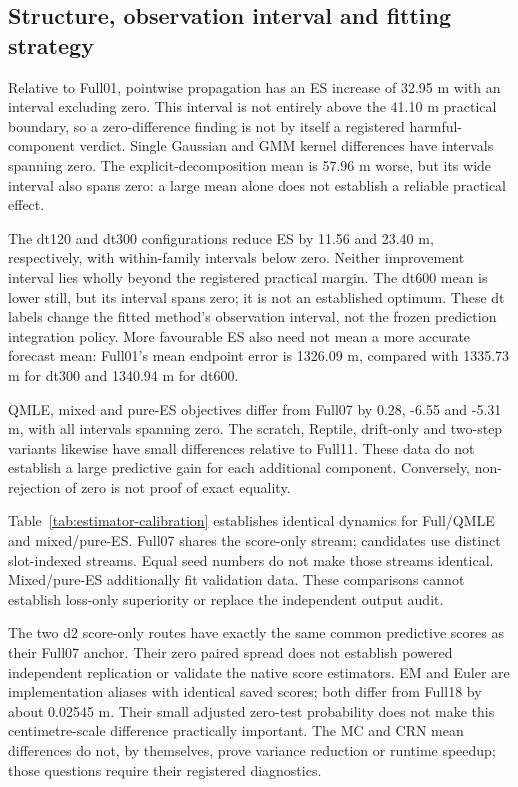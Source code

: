 \documentclass[11pt]{article}
\begin{document}
\FloatBarrier
\endgroup
\subsection{Structure, observation interval and fitting strategy}
\label{sec:method-findings}
Relative to Full01, pointwise propagation has an ES increase of 32.95 m
with an interval excluding zero. This interval is not entirely above the
41.10 m practical boundary, so a zero-difference finding is not by itself
a registered harmful-component verdict. Single Gaussian and GMM kernel
differences have intervals spanning zero. The explicit-decomposition mean
is 57.96 m worse, but its wide interval also spans zero: a large mean alone
does not establish a reliable practical effect.

The dt120 and dt300 configurations reduce ES by 11.56 and 23.40 m,
respectively, with within-family intervals below zero. Neither improvement
interval lies wholly beyond the registered practical margin. The dt600 mean
is lower still, but its interval spans zero; it is not an established optimum.
These dt labels change the fitted method's observation interval, not the
frozen prediction integration policy. More favourable ES also need not mean
a more accurate forecast mean: Full01's mean endpoint error is 1326.09 m,
compared with 1335.73 m for dt300 and 1340.94 m for dt600.

QMLE, mixed and pure-ES objectives differ from Full07 by 0.28, -6.55 and
-5.31 m, with all intervals spanning zero. The scratch, Reptile, drift-only
and two-step variants likewise have small differences relative to Full11.
These data do not establish a large predictive gain for each additional
component. Conversely, non-rejection of zero is not proof of exact equality.

\begin{samepage}
Table~\ref{tab:estimator-calibration} establishes identical dynamics for
Full/QMLE and mixed/pure-ES. Full07 shares the score-only stream; candidates
use distinct slot-indexed streams. Equal seed numbers do not make those
streams identical. Mixed/pure-ES additionally fit validation data.
These comparisons cannot establish loss-only superiority or replace
the independent output audit.
\end{samepage}

The two d2 score-only routes have exactly the same common predictive scores
as their Full07 anchor. Their zero paired spread does not establish powered
independent replication or validate the native score estimators.
EM and Euler are implementation aliases with identical saved scores; both
differ from Full18 by about 0.02545 m. Their small adjusted zero-test probability
does not make this centimetre-scale difference practically important.
The MC and CRN mean differences do not, by themselves, prove variance reduction
or runtime speedup; those questions require their registered diagnostics.
\end{document}
